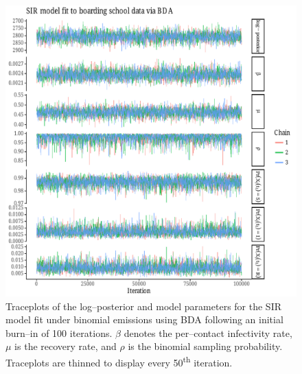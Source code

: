 \begin{figure}[htbp]
	\centering
	\includegraphics[width=\linewidth]{figures/bbs_sir_bda_traceplots.pdf}
	\caption{Traceplots of the log--posterior and model parameters for the SIR model fit under binomial emissions using BDA following an initial burn--in of 100 iterations. $ \beta $ denotes the per--contact infectivity rate, $ \mu $ is the recovery rate, and $ \rho $ is the binomial sampling probability. Traceplots are thinned to display every 50\textsuperscript{th} iteration.}
	\label{fig:bbs_sir_bda_traceplots}
\end{figure}

